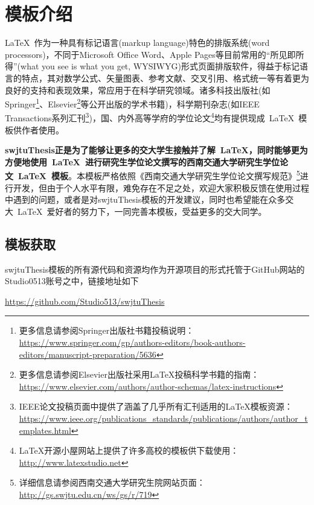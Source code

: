 
\chapter{模板介绍}

\LaTeX{}~作为一种具有标记语言(markup language)特色的排版系统(word processors)，不同于Microsoft Office Word\textsuperscript{\textregistered}、Apple Pages\textsuperscript{\textregistered}等目前常用的“所见即所得”(what you see is what you get, WYSIWYG)形式页面排版软件，得益于标记语言的特点，其对数学公式、矢量图表、参考文献、交叉引用、格式统一等有着更为良好的支持和表现效果，常应用于在科学研究领域。诸多科技出版社(如Springer\footnote{更多信息请参阅Springer出版社书籍投稿说明：\url{https://www.springer.com/gp/authors-editors/book-authors-editors/manuscript-preparation/5636}}、Elsevier\footnote{更多信息请参阅Elsevier出版社采用\LaTeX{}投稿科学书籍的指南：\url{https://www.elsevier.com/authors/author-schemas/latex-instructions}}等公开出版的学术书籍)，科学期刊杂志(如IEEE Transactions系列汇刊\footnote{IEEE论文投稿页面中提供了涵盖了几乎所有汇刊适用的\LaTeX{}模板资源：\url{https://www.ieee.org/publications_standards/publications/authors/author_templates.html}})，国、内外高等学府的学位论文\footnote{\LaTeX 开源小屋网站上提供了许多高校的模板供下载使用：\url{http://www.latexstudio.net}}均有提供现成~\LaTeX{}~模板供作者使用。

\par
\textbf{swjtuThesis正是为了能够让更多的交大学生接触并了解~\LaTeX{}，同时能够更为方便地使用~\LaTeX{}~进行研究生学位论文撰写的西南交通大学研究生学位论文~\LaTeX{}~模板}。本模板严格依照《西南交通大学研究生学位论文撰写规范》\footnote{详细信息请参阅西南交通大学研究生院网站页面：\url{http://gs.swjtu.edu.cn/ws/gs/r/719}}进行开发，但由于个人水平有限，难免存在不足之处，欢迎大家积极反馈在使用过程中遇到的问题，或者是对swjtuThesis模板的开发建议，同时也希望能在众多交大~\LaTeX{}~爱好者的努力下，一同完善本模板，受益更多的交大同学。


\section{模板获取}

swjtuThesis模板的所有源代码和资源均作为开源项目的形式托管于GitHub网站的Studio0513账号之中，链接地址如下 
\par
\begin{center}
	\url{https://github.com/Studio513/swjtuThesis}
\end{center}

